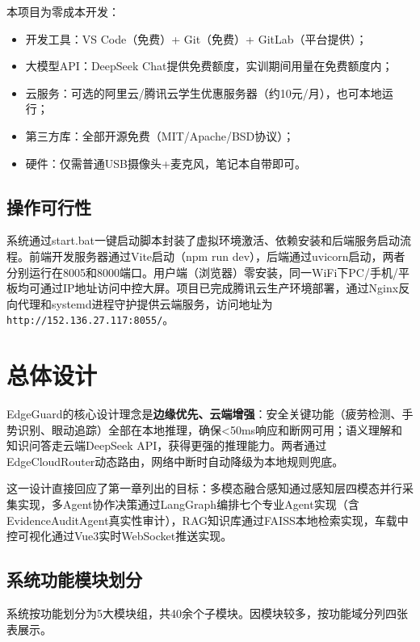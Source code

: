\documentclass[a4paper]{article}
\begin{document}
本项目为零成本开发：

\begin{itemize}
    \item 开发工具：VS Code（免费）+ Git（免费）+ GitLab（平台提供）；
    \item 大模型API：DeepSeek Chat提供免费额度，实训期间用量在免费额度内；
    \item 云服务：可选的阿里云/腾讯云学生优惠服务器（约10元/月），也可本地运行；
    \item 第三方库：全部开源免费（MIT/Apache/BSD协议）；
    \item 硬件：仅需普通USB摄像头+麦克风，笔记本自带即可。
\end{itemize}

\subsection{操作可行性}

系统通过start.bat一键启动脚本封装了虚拟环境激活、依赖安装和后端服务启动流程。前端开发服务器通过Vite启动（npm run dev），后端通过uvicorn启动，两者分别运行在8005和8000端口。用户端（浏览器）零安装，同一WiFi下PC/手机/平板均可通过IP地址访问中控大屏。项目已完成腾讯云生产环境部署，通过Nginx反向代理和systemd进程守护提供云端服务，访问地址为\texttt{http://152.136.27.117:8055/}。

\section{总体设计}

EdgeGuard的核心设计理念是\textbf{边缘优先、云端增强}：安全关键功能（疲劳检测、手势识别、眼动追踪）全部在本地推理，确保<50ms响应和断网可用；语义理解和知识问答走云端DeepSeek API，获得更强的推理能力。两者通过EdgeCloudRouter动态路由，网络中断时自动降级为本地规则兜底。

这一设计直接回应了第一章列出的目标：多模态融合感知通过感知层四模态并行采集实现，多Agent协作决策通过LangGraph编排七个专业Agent实现（含EvidenceAuditAgent真实性审计），RAG知识库通过FAISS本地检索实现，车载中控可视化通过Vue3实时WebSocket推送实现。

\subsection{系统功能模块划分}

系统按功能划分为5大模块组，共40余个子模块。因模块较多，按功能域分列四张表展示。
\end{document}
